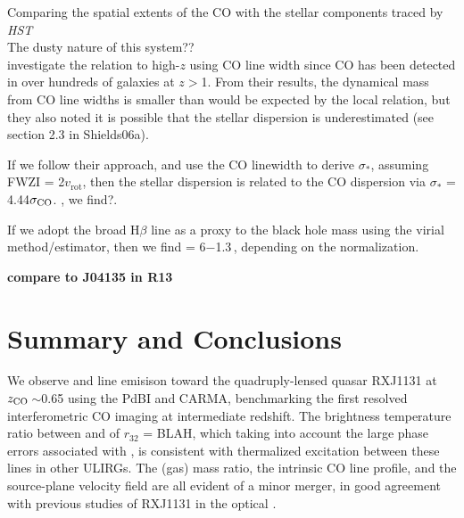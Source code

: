 \documentclass[]{emulateapj}
\begin{document}
Comparing the spatial extents of the CO with the stellar components traced by {\it HST}\\
The dusty nature of this system?? \\

\citet{Shields06a} investigate the \bhrelation relation to high-$z$ using CO line width since 
CO has been detected in over hundreds of galaxies at $z$$>$1.
From their results, the dynamical mass from CO line widths is 
smaller than would be expected by the local relation, but they also noted it is possible that the stellar dispersion is
underestimated (see section 2.3 in Shields06a).


If we follow their approach, and use the CO linewidth to derive $\sigma_*$, assuming FWZI = 2$v_\textrm{rot}$, then the stellar dispersion is related to the CO dispersion via 
$\sigma_*$ = 4.44$\sigma_{\rm CO}$.
, we find?.

If we adopt the broad H$\beta$ line as a proxy to the black hole mass using the virial method/estimator, then we find \mbh = 6$-$1.3\,\Msun \citep{Peng06a, Dai10a}, depending on the normalization. 

%
{\bf compare to J04135 in R13} \\


\section{Summary and Conclusions} \label{sec:sum}

We observe \bco and \cco line emisison toward the
quadruply-lensed quasar RXJ1131 at $z_{\rm CO}$\,$\sim$0.65 
using the PdBI and CARMA, benchmarking the 
first resolved interferometric CO imaging at intermediate redshift.
The brightness temperature ratio between \bco and \cco of $r_{32}$ = BLAH, which taking into 
account the large phase errors associated with \cco, is consistent with
thermalized excitation between these lines in other ULIRGs.
The (gas) mass ratio, the intrinsic CO line profile,
and the source-plane velocity field are all evident of
a minor merger, in good agreement with previous studies of RXJ1131 in the optical . 
\end{document}
